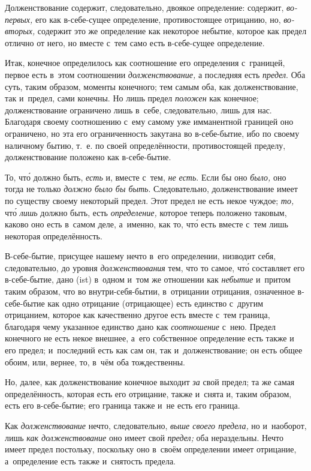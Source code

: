 Долженствование содержит, следовательно, двоякое определение: содержит,
{\em во-первых,} его как в-себе-сущее определение,
противостоящее отрицанию, но, {\em во-вторых,} содержит
это же определение как некоторое небытие, которое как предел отлично от
него, но вместе с~тем само есть в-себе-сущее определение.

Итак, конечное определилось как соотношение его определения с~границей,
первое есть в~этом соотношении {\em долженствование,} а
последняя есть {\em предел}. Оба суть, таким образом,
моменты конечного; тем самым оба, как долженствование, так и~предел, сами
конечны. Но лишь предел {\em положен} как конечное;
долженствование ограничено лишь в~себе, следовательно, лишь для нас.
Благодаря своему соотношению с~ему самому уже имманентной границей оно
ограничено, но эта его ограниченность закутана во в-себе-бытие, ибо по
своему наличному бытию, т.~е. по своей определённости, противостоящей
пределу, долженствование положено как в-себе-бытие.

То, чт\'{о} должно быть, {\em есть} и, вместе с~тем,
{\em не есть}. Если бы оно {\em было,} оно тогда не только
{\em должно было бы быть}. Следовательно,
долженствование имеет по существу своему некоторый предел. Этот предел не
есть некое чуждое; {\em то,} чт\'{о} {\em лишь} должно быть, есть
{\em определение,} которое теперь положено таковым,
каково оно есть в~самом деле, а~именно, как то, чт\'{о} есть вместе с~тем лишь
некоторая определённость.

В-себе-бытие, присущее нашему нечто в~его определении, низводит себя,
следовательно, до уровня {\em долженствования} тем, что
то самое, чт\'{о} составляет его в-себе-бытие, дано (ist) в~одном и~том же
отношении как {\em небытие} и~притом таким образом, что
во внутри-себя-бытии, в~отрицании отрицания, означенное в-себе-бытие как
одно отрицание (отрицающее) есть единство с~другим отрицанием, которое как
качественно другое есть вместе с~тем граница, благодаря чему указанное
единство дано как {\em соотношение} с~нею. Предел
конечного не есть некое внешнее, а~его собственное определение есть также и
его предел; и~последний есть как сам он, так и~долженствование; он есть
общее обоим, или, вернее, то, в~чём оба тождественны.

Но, далее, как долженствование конечное выходит {\em за}
свой предел; та же самая определённость, которая есть его отрицание, также
и~снята и, таким образом, есть его в-себе-бытие; его граница также и~не
есть его граница.

Как {\em долженствование} нечто, следовательно,
{\em выше своего предела,} но и~наоборот, лишь
{\em как долженствование} оно имеет свой
{\em предел;} оба нераздельны. Нечто имеет предел
постольку, поскольку оно в~своём определении имеет отрицание, а~определение
есть также и~снятость предела.

